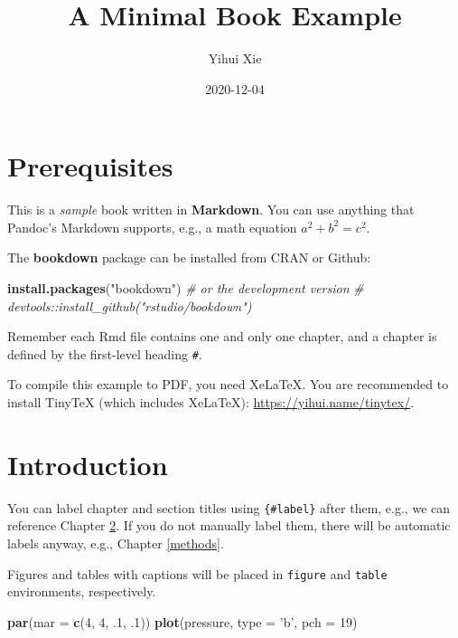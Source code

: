 \documentclass[
]{book}
\title{A Minimal Book Example}
\author{Yihui Xie}
\date{2020-12-04}
\newenvironment{Shaded}{\begin{snugshade}}{\end{snugshade}}
\newcommand{\CommentTok}[1]{\textcolor[rgb]{0.56,0.35,0.01}{\textit{#1}}}
\newcommand{\DataTypeTok}[1]{\textcolor[rgb]{0.13,0.29,0.53}{#1}}
\newcommand{\DecValTok}[1]{\textcolor[rgb]{0.00,0.00,0.81}{#1}}
\newcommand{\FloatTok}[1]{\textcolor[rgb]{0.00,0.00,0.81}{#1}}
\newcommand{\KeywordTok}[1]{\textcolor[rgb]{0.13,0.29,0.53}{\textbf{#1}}}
\newcommand{\NormalTok}[1]{#1}
\newcommand{\StringTok}[1]{\textcolor[rgb]{0.31,0.60,0.02}{#1}}
\begin{document}
\maketitle

{
\setcounter{tocdepth}{1}
\tableofcontents
}
\hypertarget{prerequisites}{%
\chapter{Prerequisites}\label{prerequisites}}

This is a \emph{sample} book written in \textbf{Markdown}. You can use anything that Pandoc's Markdown supports, e.g., a math equation \(a^2 + b^2 = c^2\).

The \textbf{bookdown} package can be installed from CRAN or Github:

\begin{Shaded}
\begin{Highlighting}[]
\KeywordTok{install.packages}\NormalTok{(}\StringTok{"bookdown"}\NormalTok{)}
\CommentTok{# or the development version}
\CommentTok{# devtools::install_github("rstudio/bookdown")}
\end{Highlighting}
\end{Shaded}

Remember each Rmd file contains one and only one chapter, and a chapter is defined by the first-level heading \texttt{\#}.

To compile this example to PDF, you need XeLaTeX. You are recommended to install TinyTeX (which includes XeLaTeX): \url{https://yihui.name/tinytex/}.

\hypertarget{intro}{%
\chapter{Introduction}\label{intro}}

You can label chapter and section titles using \texttt{\{\#label\}} after them, e.g., we can reference Chapter \ref{intro}. If you do not manually label them, there will be automatic labels anyway, e.g., Chapter \ref{methods}.

Figures and tables with captions will be placed in \texttt{figure} and \texttt{table} environments, respectively.

\begin{Shaded}
\begin{Highlighting}[]
\KeywordTok{par}\NormalTok{(}\DataTypeTok{mar =} \KeywordTok{c}\NormalTok{(}\DecValTok{4}\NormalTok{, }\DecValTok{4}\NormalTok{, }\FloatTok{.1}\NormalTok{, }\FloatTok{.1}\NormalTok{))}
\KeywordTok{plot}\NormalTok{(pressure, }\DataTypeTok{type =} \StringTok{'b'}\NormalTok{, }\DataTypeTok{pch =} \DecValTok{19}\NormalTok{)}
\end{Highlighting}
\end{Shaded}
\end{document}
